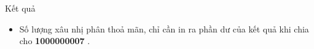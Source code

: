 Kết quả
\begin{itemize}
	\item Số lượng xâu nhị phân thoả mãn, chỉ cần in ra phần dư của kết quả khi chia cho \textbf{ 1000000007 } .
\end{itemize}